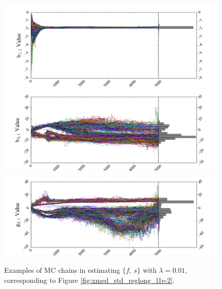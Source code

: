 \documentclass[iop,numberedappendix,apj,]{emulateapj}
\def\memoYF#1{\color{red}[NOTE: {\bf #1}]\color{black}}
\begin{document}
\begin{figure}[!htbp]
    \begin{center}
\includegraphics[width=\hsize]{reglong_l1e-2_trace0.png}
\includegraphics[width=\hsize]{reglong_l1e-2_trace8.png}
\includegraphics[width=\hsize]{reglong_l1e-2_trace13.png}
    \end{center}
    \caption{Examples of MC chains in estimating $\{ f,\,s\}$ with $\lambda = 0.01$, corresponding to Figure \ref{fig:xmed_std_reglong_l1e-2}. }
\label{fig:shrinkwrap}
\end{figure}


\end{document}
